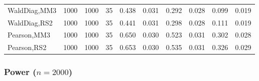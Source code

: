 \documentclass[
]{article}
\begin{document}
\begin{table}[H]
{\begin{tabular}[t]{lrrrrrrlrr}
\hspace{1em}WaldDiag,MM3 & 1000 & 1000 & 35 & 0.438 & 0.031 & 0.292 & 0.028 & 0.099 & 0.019\\
\hspace{1em}WaldDiag,RS2 & 1000 & 1000 & 35 & 0.441 & 0.031 & 0.298 & 0.028 & 0.111 & 0.019\\
\hspace{1em}Pearson,MM3 & 1000 & 1000 & 35 & 0.650 & 0.030 & 0.523 & 0.031 & 0.302 & 0.028\\
\hspace{1em}Pearson,RS2 & 1000 & 1000 & 35 & 0.653 & 0.030 & 0.535 & 0.031 & 0.326 & 0.029\\
\bottomrule
\end{tabular}}
\endgroup{}
\end{table}

\hypertarget{power-n2000-1}{%
\subsubsection{\texorpdfstring{Power
(\(n=2000\))}{Power (n=2000)}}\label{power-n2000-1}}
\end{document}
